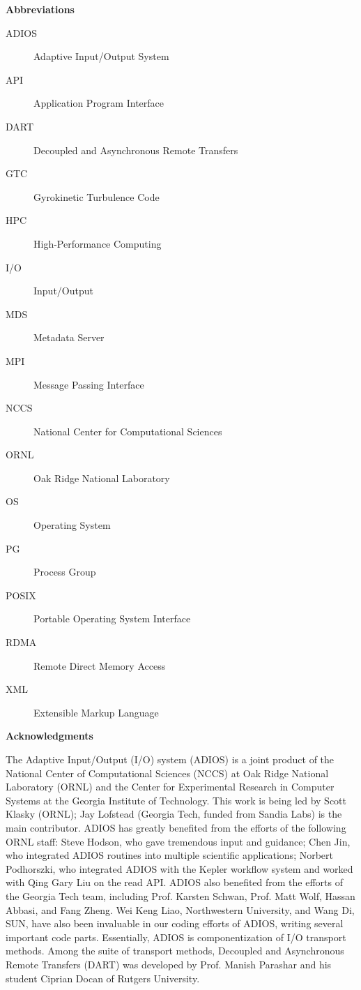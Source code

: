 \vspace{66pt}
\textbf{Abbreviations}

\begin{description}
\item[ADIOS]  Adaptive Input/Output System
\item[API] Application Program Interface
\item[DART] Decoupled and Asynchronous Remote Transfers
\item[GTC] Gyrokinetic Turbulence Code
\item[HPC] High-Performance Computing
\item[I/O] Input/Output
\item[MDS] Metadata Server
\item[MPI] Message Passing Interface
\item[NCCS] National Center for Computational Sciences
\item[ORNL] Oak Ridge National Laboratory
\item[OS] Operating System
\item[PG] Process Group
\item[POSIX] Portable Operating System Interface
\item[RDMA] Remote Direct Memory Access
\item[XML] Extensible Markup Language
\end{description}


\vspace{18pt}
\begin{center}
{\large \textbf{Acknowledgments}}
\end{center}

\vspace{6pt}
The Adaptive Input/Output (I/O) system (ADIOS) is a joint product of the National 
Center of Computational Sciences (NCCS) at Oak Ridge National Laboratory (ORNL) 
and the Center for Experimental Research in Computer Systems at the Georgia Institute 
of Technology. This work is being led by Scott Klasky (ORNL); Jay Lofstead (Georgia 
Tech, funded from Sandia Labs) is the main contributor. ADIOS has greatly benefited 
from the efforts of the following ORNL staff: Steve Hodson, who gave tremendous 
input and guidance; Chen Jin, who integrated ADIOS routines into multiple scientific 
applications; Norbert Podhorszki, who integrated ADIOS with the Kepler workflow 
system and worked with Qing Gary Liu on the read API. ADIOS also benefited from 
the efforts of the Georgia Tech team, including Prof. Karsten Schwan, Prof. Matt 
Wolf, Hassan Abbasi, and Fang Zheng. Wei Keng Liao, Northwestern University, and 
Wang Di, SUN, have also been invaluable in our coding efforts of ADIOS, writing 
several important code parts. Essentially, ADIOS is componentization of I/O transport 
methods. Among the suite of transport methods, Decoupled and Asynchronous 
Remote Transfers (DART) was developed by Prof. Manish Parashar and his student 
Ciprian Docan of Rutgers University.

